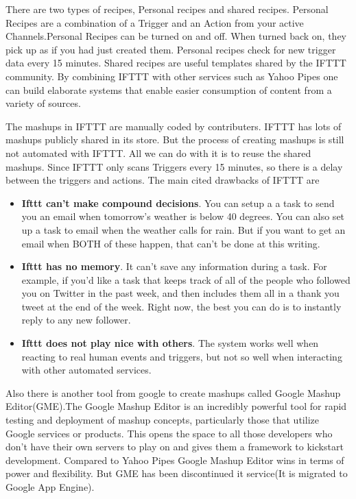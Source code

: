 \begin{spacing}{1.5}
There are two types of recipes, Personal recipes and shared recipes. Personal Recipes are a combination of a Trigger and an Action from your active Channels.Personal Recipes can be turned on and off. When turned back on, they pick up as if you had just created them. Personal recipes check for new trigger data every 15 minutes. Shared recipes are useful templates shared by the IFTTT community. By combining IFTTT with other services such as Yahoo Pipes  one can build elaborate systems that enable easier consumption of content from a variety of sources.

The mashups in IFTTT are manually coded by contributers. IFTTT has  lots of mashups publicly shared in its store. But the process of creating mashups is still not automated with IFTTT. All we can do with it is to reuse the shared mashups. Since IFTTT only scans Triggers every 15 minutes, so there is a delay between the triggers and actions. The main cited drawbacks of IFTTT are

\begin{itemize}
\item {\bf Ifttt can’t make compound decisions}. You can setup a a task to send you an email when tomorrow’s weather is below 40 degrees. You can also set up a task to email when the weather calls for rain. But if you want to get an email when BOTH of these happen, that can’t be done at this writing.
\item {\bf Ifttt has no memory}. It can’t save any information during a task. For example, if you'd  like a task that keeps track of all of the people who followed you on Twitter in the past week, and then includes them all in a thank you tweet at the end of the week. Right now, the best you can do is to instantly reply to any new follower.
\item {\bf Ifttt does not play nice with others}. The system works well when reacting to real human events and triggers, but not so well when interacting with other automated services.
\end{itemize}

Also there is another tool from google to create mashups called Google Mashup Editor(GME).The Google Mashup Editor is an incredibly powerful tool for rapid testing and deployment of mashup concepts, particularly those that utilize Google services or products. This opens the space to all those developers who don't have their own servers to play on and gives them a framework to kickstart development. Compared to Yahoo Pipes Google Mashup Editor wins in terms of power and flexibility. But GME has been discontinued it service(It is migrated to Google App Engine).


\end{spacing}
